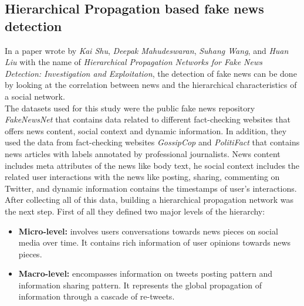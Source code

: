 \documentclass[10pt, english]{report}
\begin{document}
\subsection{Hierarchical Propagation based fake news detection \cite{shu2020hierarchical}}
In a paper wrote by \textit{Kai Shu}, \textit{Deepak Mahudeswaran}, \textit{Suhang Wang}, and \textit{Huan Liu} with the name of \textit{Hierarchical Propagation Networks for Fake News Detection: Investigation and Exploitation}, the detection of fake news can be done by looking at the correlation between news and the hierarchical characteristics of a social network.\\

The datasets used for this study were the public fake news repository \textit{FakeNewsNet} \cite{shu2018fakenewsnet} that contains data related to different fact-checking websites that offers news content, social context and dynamic information. In addition, they used the data from fact-checking websites \textit{GossipCop} and \textit{PolitiFact} that contains news articles with labels annotated by professional journalists. News content includes meta attributes of the news like body text, he social context includes the related user interactions with the news like posting, sharing, commenting on Twitter, and dynamic information contains the timestamps of user's interactions.\\

After collecting all of this data, building a hierarchical propagation network was the next step. First of all they defined two major levels of the hierarchy: 

\begin{itemize}
\item \textbf{Micro-level:} involves users conversations towards news pieces on social media over time. It contains rich information of user opinions towards news pieces.
\item \textbf{Macro-level:} encompasses information on tweets posting pattern and information sharing pattern. It represents the global propagation of information through a cascade of re-tweets.
\end{itemize}
\end{document}
